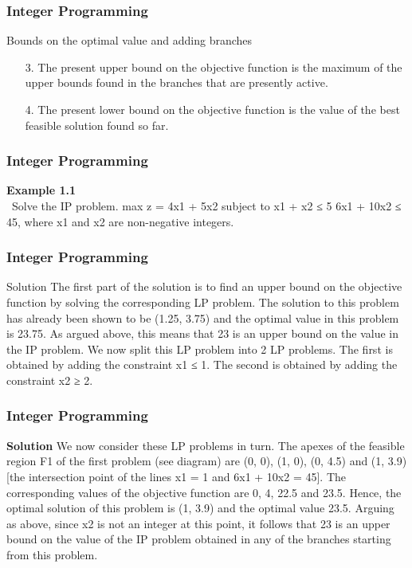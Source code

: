\begin{frame} 
\frametitle{Integer Programming}     
Bounds on the optimal value and adding branches
\begin{itemize}
\item[3.] The present upper bound on the objective function is
the maximum of the upper bounds found in the
branches that are presently active.
\item[4.] The present lower bound on the objective function is
the value of the best feasible solution found so far.
\end{itemize}
\end{frame}  
\begin{frame} 
\frametitle{Integer Programming}     
\noindent \textbf{Example 1.1}\\\
Solve the IP problem.
max z = 4x1 + 5x2
subject to
x1 + x2 ≤ 5
6x1 + 10x2 ≤ 45,
where x1 and x2 are non-negative integers.
\end{frame}  
\begin{frame} 
\frametitle{Integer Programming}     
Solution
The first part of the solution is to find an upper bound on the
objective function by solving the corresponding LP problem.
The solution to this problem has already been shown to be (1.25,
3.75) and the optimal value in this problem is 23.75. As argued
above, this means that 23 is an upper bound on the value in the IP
problem.
We now split this LP problem into 2 LP problems. The first is
obtained by adding the constraint x1 ≤ 1. The second is obtained
by adding the constraint x2 ≥ 2.
\end{frame}  
\begin{frame} 
\frametitle{Integer Programming}     
\noindent \textbf{Solution}
We now consider these LP problems in turn. The apexes of the
feasible region F1 of the first problem (see diagram) are (0, 0), (1,
0), (0, 4.5) and (1, 3.9) [the intersection point of the lines x1 = 1
and 6x1 + 10x2 = 45].
The corresponding values of the objective function are 0, 4, 22.5
and 23.5. Hence, the optimal solution of this problem is (1, 3.9)
and the optimal value 23.5.
Arguing as above, since x2 is not an integer at this point, it follows
that 23 is an upper bound on the value of the IP problem obtained
in any of the branches starting from this problem.
\end{frame}  
